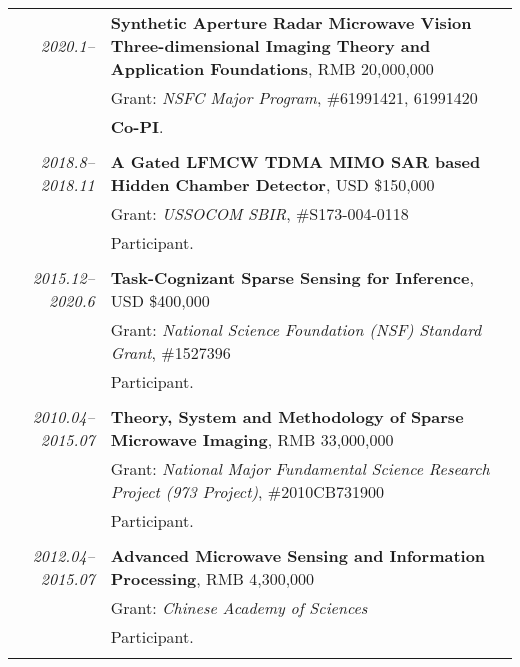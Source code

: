 \documentclass[paper=a4,fontsize=11pt]{scrartcl}
\begin{document}
\begin{longtable}{r|p{12cm}}
	\emph{2020.1--} & \textbf{Synthetic Aperture Radar Microwave Vision Three-dimensional Imaging Theory and Application Foundations}, RMB 20,000,000 \\
	& Grant: \emph{NSFC Major Program}, \#61991421, 61991420\\
	& \textbf{Co-PI}.\\
	\multicolumn{2}{c}{} \\
	
	\emph{2018.8--2018.11} & \textbf{A Gated LFMCW TDMA MIMO SAR based Hidden Chamber Detector}, USD \$150,000 \\
	& Grant: \emph{USSOCOM SBIR}, \#S173-004-0118\\
	& Participant.\\
	\multicolumn{2}{c}{} \\
	
	\emph{2015.12--2020.6} & \textbf{Task-Cognizant Sparse Sensing for Inference}, USD \$400,000 \\
	& Grant: \emph{National Science Foundation (NSF) Standard Grant}, \#1527396\\
	& Participant.\\
	\multicolumn{2}{c}{} \\
	
	
	
	\emph{2010.04--2015.07} & \textbf{Theory, System and Methodology of Sparse Microwave Imaging}, RMB 33,000,000 \\
	& Grant: \emph{National Major Fundamental Science Research Project (973 Project)}, \#2010CB731900\\
	& Participant.\\
	\multicolumn{2}{c}{} \\
	
	\emph{2012.04--2015.07} & \textbf{Advanced Microwave Sensing and Information Processing}, RMB 4,300,000 \\
	& Grant: \emph{Chinese Academy of Sciences}\\
	& Participant.\\
	\multicolumn{2}{c}{}
	
\end{longtable}
\end{document}
